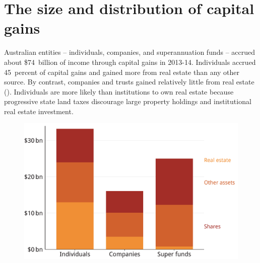 \section{The size and distribution of capital gains}%
\enlargethispage{0.5\baselineskip}%



Australian entities -- individuals, companies, and superannuation funds -- accrued about \$74~billion of income through capital gains in 2013-14. Individuals accrued 45~percent
of capital gains and gained more from real estate than any other source. By contrast, companies and trusts gained relatively little from real estate (). Individuals are more likely than institutions to own real estate because progressive state land taxes discourage large property holdings and institutional real estate investment.


\begin{figure}
\label{fig:CGT-by-entity-asset}
\includegraphics[width=\linewidth]{CGT-NG-atlas/b5-palatino-atlas/CGT-by-asset-1}

\par
\vspace*{4\baselineskip}
\end{figure}

